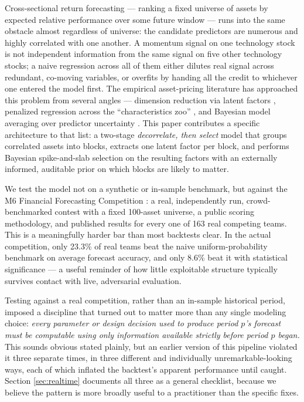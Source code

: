 \documentclass[11pt]{article}
\begin{document}
Cross-sectional return forecasting --- ranking a fixed universe of assets
by expected relative performance over some future window --- runs into
the same obstacle almost regardless of universe: the candidate predictors
are numerous and highly correlated with one another. A momentum signal on
one technology stock is not independent information from the same signal
on five other technology stocks; a naive regression across all of them
either dilutes real signal across redundant, co-moving variables, or
overfits by handing all the credit to whichever one entered the model
first. The empirical asset-pricing literature has approached this problem
from several angles --- dimension reduction via latent factors
\citep{kellypruittsu2020}, penalized regression across the ``characteristics
zoo'' \citep{degroot2018}, and Bayesian model averaging over predictor
uncertainty \citep{avramov2002}. This paper contributes a specific
architecture to that list: a two-stage \emph{decorrelate, then select}
model that groups correlated assets into blocks, extracts one latent
factor per block, and performs Bayesian spike-and-slab selection on the
resulting factors with an externally informed, auditable prior on which
blocks are likely to matter.

We test the model not on a synthetic or in-sample benchmark, but against
the M6 Financial Forecasting Competition \citep{makridakis2024}: a real,
independently run, crowd-benchmarked contest with a fixed 100-asset
universe, a public scoring methodology, and published results for every
one of 163 real competing teams. This is a meaningfully harder bar than
most backtests clear. In the actual competition, only 23.3\% of real
teams beat the naive uniform-probability benchmark on average forecast
accuracy, and only 8.6\% beat it with statistical significance --- a
useful reminder of how little exploitable structure typically survives
contact with live, adversarial evaluation.

Testing against a real competition, rather than an in-sample historical
period, imposed a discipline that turned out to matter more than any
single modeling choice: \emph{every parameter or design decision used to
produce period $p$'s forecast must be computable using only information
available strictly before period $p$ began.} This sounds obvious stated
plainly, but an earlier version of this pipeline violated it three
separate times, in three different and individually unremarkable-looking
ways, each of which inflated the backtest's apparent performance until
caught. Section \ref{sec:realtime} documents all three as a general
checklist, because we believe the pattern is more broadly useful to a
practitioner than the specific fixes.
\end{document}
